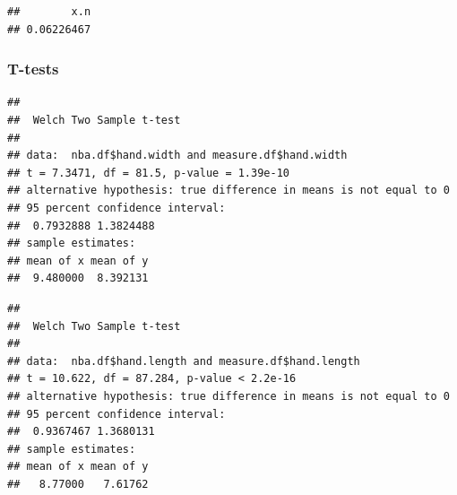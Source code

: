 \documentclass[]{article}
\newenvironment{Shaded}{\begin{snugshade}}{\end{snugshade}}
\newcommand{\DataTypeTok}[1]{\textcolor[rgb]{0.13,0.29,0.53}{#1}}
\newcommand{\KeywordTok}[1]{\textcolor[rgb]{0.13,0.29,0.53}{\textbf{#1}}}
\newcommand{\NormalTok}[1]{#1}
\newcommand{\OperatorTok}[1]{\textcolor[rgb]{0.81,0.36,0.00}{\textbf{#1}}}
\newcommand{\OtherTok}[1]{\textcolor[rgb]{0.56,0.35,0.01}{#1}}
\begin{document}
\begin{verbatim}
##        x.n 
## 0.06226467
\end{verbatim}

\subsubsection{T-tests}
\label{sec:Ttest}

\begin{Shaded}
\end{Shaded}

\begin{verbatim}
## 
##  Welch Two Sample t-test
## 
## data:  nba.df$hand.width and measure.df$hand.width
## t = 7.3471, df = 81.5, p-value = 1.39e-10
## alternative hypothesis: true difference in means is not equal to 0
## 95 percent confidence interval:
##  0.7932888 1.3824488
## sample estimates:
## mean of x mean of y 
##  9.480000  8.392131
\end{verbatim}

\begin{Shaded}
\end{Shaded}

\begin{verbatim}
## 
##  Welch Two Sample t-test
## 
## data:  nba.df$hand.length and measure.df$hand.length
## t = 10.622, df = 87.284, p-value < 2.2e-16
## alternative hypothesis: true difference in means is not equal to 0
## 95 percent confidence interval:
##  0.9367467 1.3680131
## sample estimates:
## mean of x mean of y 
##   8.77000   7.61762
\end{verbatim}

\begin{Shaded}
\end{Shaded}
\end{document}
